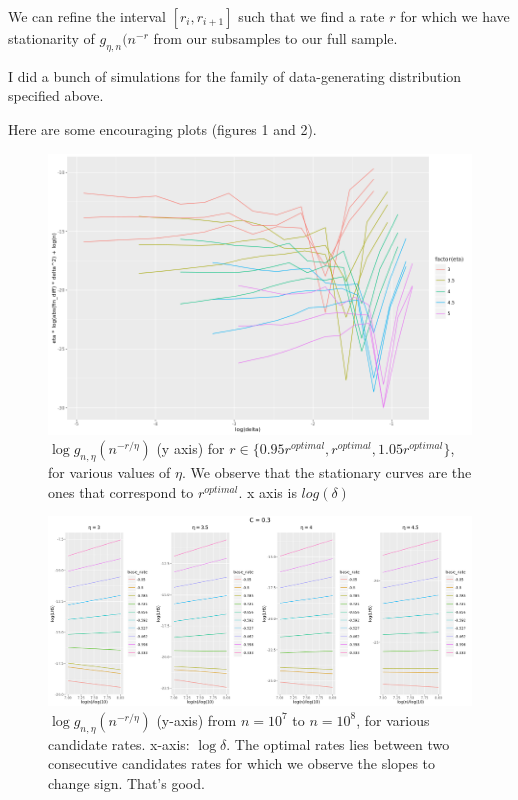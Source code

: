 \documentclass[a4paper]{article}
\begin{document}
We can refine the interval $[r_i, r_{i+1}]$ such that we find a rate $r$ for which we have stationarity of $g_{\eta, n}(n^{-r}$ from our subsamples to our full sample.


I did a bunch of simulations for the family of data-generating distribution specified above. 

Here are some encouraging plots (figures 1 and 2).

\begin{figure}[!htbp]
	\caption{$\log g_{n, \eta}(n^{-r / \eta})$ (y axis) for $r \in \{0.95 r^{optimal}, r^{optimal}, 1.05 r^{optimal} \}$, for various values of $\eta$. We observe that the stationary curves are the ones that correspond to $r^{optimal}$. x axis is $log(\delta)$}
   \includegraphics[scale = 0.4]{LHS-bracketing_of_delta_n^star-easy-tp.png}
\end{figure}

\begin{figure}[!htbp]
	\caption{$\log g_{n, \eta}(n^{-r / \eta})$ (y-axis) from $n = 10^7$ to $n=10^8$, for various candidate rates. x-axis: $\log \delta$. The optimal rates lies between two consecutive candidates rates for which we observe the slopes to change sign. That's good.}
   \includegraphics[scale = 0.4]{rates_comb-easy-tp-1e7to1e8.png}
\end{figure}
\end{document}
